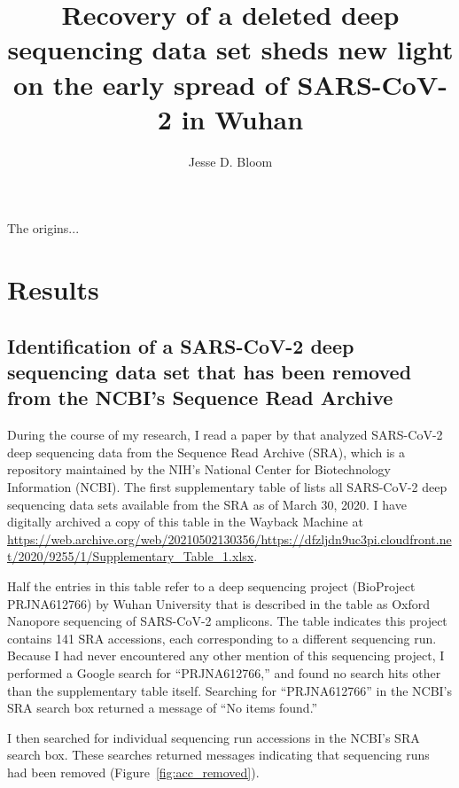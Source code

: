 \documentclass[9pt,twocolumn,twoside]{gsajnl_modified}
\title{Recovery of a deleted deep sequencing data set sheds new light on the early spread of SARS-CoV-2 in Wuhan}
\author[]{\Large Jesse D. Bloom}
\affil[]{Fred Hutchinson Cancer Research Center}
\affil[]{Howard Hughes Medical Institute}
\affil[]{Seattle, WA, USA}
\begin{document}
\maketitle
\thispagestyle{firststyle}
\firstpagefootnote

\vspace{-33pt}%

\lettrine[lines=2]{\color{color2}T}{}he origins... 

\section{Results}

\subsection{Identification of a SARS-CoV-2 deep sequencing data set that has been removed from the NCBI's Sequence Read Archive}
During the course of my research, I read a paper by \citet{farkas2020insights} that analyzed SARS-CoV-2 deep sequencing data from the Sequence Read Archive (SRA), which is a repository maintained by the NIH's National Center for Biotechnology Information (NCBI).
The first supplementary table of \citet{farkas2020insights} lists all SARS-CoV-2 deep sequencing data sets available from the SRA as of March 30, 2020.
I have digitally archived a copy of this table in the Wayback Machine at \url{https://web.archive.org/web/20210502130356/https://dfzljdn9uc3pi.cloudfront.net/2020/9255/1/Supplementary_Table_1.xlsx}. 

Half the entries in this table refer to a deep sequencing project (BioProject PRJNA612766) by Wuhan University that is described in the table as Oxford Nanopore sequencing of SARS-CoV-2 amplicons.
The table indicates this project contains 141 SRA accessions, each corresponding to a different sequencing run.
Because I had never encountered any other mention of this sequencing project, I performed a Google search for ``PRJNA612766,'' and found no search hits other than the supplementary table itself.
Searching for ``PRJNA612766'' in the NCBI's SRA search box returned a message of ``No items found.''

I then searched for individual sequencing run accessions in the NCBI's SRA search box.
These searches returned messages indicating that sequencing runs had been removed (Figure~\ref{fig:acc_removed}).
\end{document}
